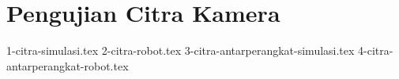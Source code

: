 \section{Pengujian Citra Kamera}
\label{sec:pengujiancitrakamera}

\textcolor{red}{\lipsum[1-2]}

{1-citra-simulasi.tex}
{2-citra-robot.tex}
{3-citra-antarperangkat-simulasi.tex}
{4-citra-antarperangkat-robot.tex}

